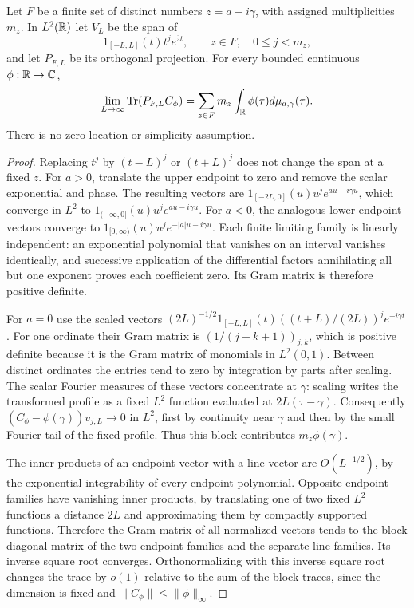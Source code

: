 \begin{theorem}\label{thm:finite-packet}
Let $F$ be a finite set of distinct numbers $z=a+i\gamma$, with
assigned multiplicities $m_z$.
In $L^2(\mathbb R)$ let $V_L$ be the span of
\[
 1_{[-L,L]}(t)t^j e^{\overline zt},\qquad z\in F,\quad 0\leq j<m_z,
\]
and let $P_{F,L}$ be its orthogonal projection. For every bounded
continuous $\phi:\mathbb R\to\mathbb C$,
\begin{equation}\label{eq:packet-limit}
 \lim_{L\to\infty}\operatorname{Tr}(P_{F,L}C_\phi)
       =\sum_{z\in F}m_z\int_\mathbb R\phi(\tau)d\mu_{a,\gamma}(\tau).
\end{equation}
There is no zero-location or simplicity assumption.
\end{theorem}
\begin{proof}
Replacing $t^j$ by $(t-L)^j$ or $(t+L)^j$ does not change the
span at a fixed $z$. For $a>0$, translate the upper endpoint to
zero and remove the scalar exponential and phase. The resulting
vectors are
$1_{[-2L,0]}(u)u^j e^{au-i\gamma u}$, which converge in $L^2$
to $1_{(-\infty,0]}(u)u^j e^{au-i\gamma u}$.
For $a<0$, the analogous lower-endpoint vectors converge to
$1_{[0,\infty)}(u)u^j e^{-|a|u-i\gamma u}$.
Each finite limiting family is linearly independent: an exponential
polynomial that vanishes on an interval vanishes identically, and
successive application of the differential factors annihilating all
but one exponent proves each coefficient zero. Its Gram matrix is
therefore positive definite.

For $a=0$ use the scaled vectors
$(2L)^{-1/2}1_{[-L,L]}(t)((t+L)/(2L))^j e^{-i\gamma t}$.
For one ordinate their Gram matrix is
$(1/(j+k+1))_{j,k}$, which is positive definite because it is the
Gram matrix of monomials in $L^2(0,1)$. Between distinct ordinates
the entries tend to zero by integration by parts after scaling.
The scalar Fourier measures of these vectors concentrate at
$\gamma$: scaling writes the transformed profile as a fixed
$L^2$ function evaluated at $2L(\tau-\gamma)$.
Consequently $(C_\phi-\phi(\gamma))v_{j,L}\to0$ in $L^2$,
first by continuity near $\gamma$ and then by the small Fourier
tail of the fixed profile. Thus this block contributes
$m_z\phi(\gamma)$.

The inner products of an endpoint vector with a line vector are
$O(L^{-1/2})$, by the exponential integrability of every endpoint
polynomial. Opposite endpoint families have vanishing inner
products, by translating one of two fixed $L^2$ functions a
distance $2L$ and approximating them by compactly supported functions.
Therefore the Gram matrix of all normalized vectors tends to the
block diagonal matrix of the two endpoint families and the separate
line families. Its inverse square root converges. Orthonormalizing
with this inverse square root changes the trace by $o(1)$ relative
to the sum of the block traces, since the dimension is fixed and
$\|C_\phi\|\leq\|\phi\|_\infty$.


\end{proof}
